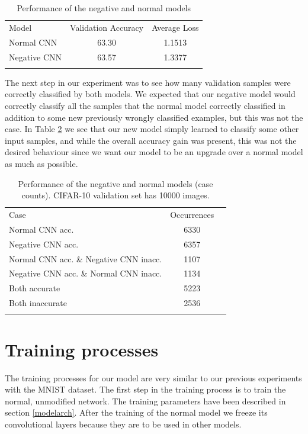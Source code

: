 \documentclass[b5paper]{book}
\let\cite\parencite
\begin{document}
\begin{table}
\centering
\caption{Performance of the negative and normal models}
\label{tab:1}
\begin{tabular}{lcc}
\hline\noalign{\smallskip}
Model & Validation Accuracy & Average Loss  \\
\noalign{\smallskip}\hline\noalign{\smallskip}
Normal CNN & 63.30 & 1.1513 \\
Negative CNN & 63.57 & 1.3377 \\
\noalign{\smallskip}\hline
\end{tabular}
\end{table}

The next step in our experiment was to see how many validation samples were correctly classified by both models. We expected that our negative model would correctly classify all the samples that the normal model correctly classified in addition to some new previously wrongly classified examples, but this was not the case. In Table \ref{tab:2} we see that our new model simply learned to classify some other input samples, and while the overall accuracy gain was present, this was not the desired behaviour since we want our model to be an upgrade over a normal model as much as possible. 

\begin{table}
\centering
\caption{Performance of the negative and normal models (case counts). CIFAR-10 validation set has 10000 images.}
\label{tab:2}
\begin{tabular}{lcc}
\hline\noalign{\smallskip}
Case & Occurrences \\
\noalign{\smallskip}\hline\noalign{\smallskip}
Normal CNN acc. & 6330 \\
Negative CNN acc. & 6357 \\
Normal CNN acc. \& Negative CNN inacc. & 1107 \\
Negative CNN acc. \& Normal CNN inacc. & 1134 \\
Both accurate & 5223 \\
Both inaccurate & 2536 \\
\noalign{\smallskip}\hline
\end{tabular}
\end{table}

\section{Training processes}
\label{datasettraining}

The training processes for our model are very similar to our previous experiments with the MNIST dataset. \cite{milovsevic2019classification} The first step in the training process is to train the normal, unmodified network. The training parameters have been described in section \ref{modelarch}. After the training of the normal model we freeze its convolutional layers because they are to be used in other models.
\end{document}
